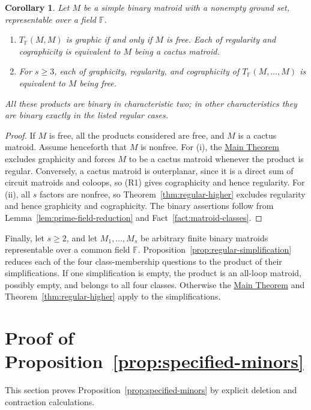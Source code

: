 \documentclass[12pt,a4paper]{article}
\numberwithin{equation}{section}
\newcommand{\F}{\mathbb F}
\newcommand{\mainthm}{\hyperref[thm:regular-two-factor]{Main Theorem}}
\newtheorem{corollary}[corollary]{Corollary}
\theoremstyle{definition}
\theoremstyle{remark}
\begin{document}
\begin{corollary}\label{cor:repeated-factors}
Let \(M\) be a simple binary matroid with a nonempty ground set,
representable over a field \(\F\).
\begin{enumerate}[label=\textup{(\roman*)},leftmargin=2.5em]
\item \(T_{\F}(M,M)\) is graphic if and only if \(M\) is free.
Each of regularity and cographicity is equivalent to \(M\) being
a cactus matroid.
\item For \(s\ge3\), each of graphicity, regularity, and
cographicity of \(T_{\F}(M,\ldots,M)\) is equivalent to \(M\)
being free.
\end{enumerate}
All these products are binary in characteristic two; in other
characteristics they are binary exactly in the listed regular cases.
\end{corollary}
\begin{proof}
If \(M\) is free, all the products considered are free, and
\(M\) is a cactus matroid.  Assume henceforth that \(M\) is
nonfree.  For \textup{(i)}, the \mainthm{} excludes graphicity
and forces \(M\) to be a cactus matroid whenever the product
is regular.  Conversely, a cactus matroid is outerplanar, since
it is a direct sum of circuit matroids and coloops, so
\textup{(R1)} gives cographicity and hence regularity.
For \textup{(ii)}, all \(s\) factors are nonfree, so
Theorem~\ref{thm:regular-higher} excludes regularity and hence
graphicity and cographicity.  The binary assertions follow from
Lemma~\ref{lem:prime-field-reduction} and
Fact~\ref{fact:matroid-classes}.
\end{proof}

Finally, let \(s\ge2\), and let \(M_1,\ldots,M_s\) be arbitrary
finite binary matroids representable over a common field \(\F\).
Proposition~\ref{prop:regular-simplification} reduces each of the
four class-membership questions to the product of their
simplifications.  If one simplification is empty, the product is
an all-loop matroid, possibly empty, and belongs to all four
classes.  Otherwise the \mainthm{} and
Theorem~\ref{thm:regular-higher} apply to the simplifications.

\section{Proof of Proposition~\ref*{prop:specified-minors}}\label{sec:minor-proofs}
This section proves Proposition~\ref{prop:specified-minors} by
explicit deletion and contraction calculations.
\end{document}
